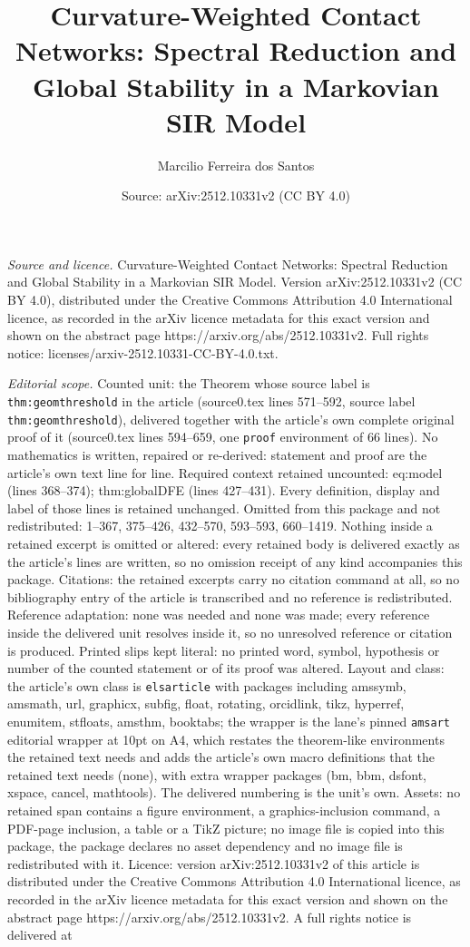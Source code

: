 \documentclass[10pt,a4paper]{amsart}
\title[Curvature-Weighted Contact Networks: Spectral Reduction and ]{Curvature-Weighted Contact Networks: Spectral Reduction and Global Stability in a Markovian SIR Model}
\author{Marcilio Ferreira dos Santos}
\date{Source: arXiv:2512.10331v2 (CC BY 4.0)}
\begin{document}
\maketitle

\noindent\emph{Source and licence.} Curvature-Weighted Contact Networks: Spectral Reduction and Global Stability in a Markovian SIR Model. Version arXiv:2512.10331v2 (CC BY 4.0), distributed under the Creative Commons Attribution 4.0 International licence, as recorded in the arXiv licence metadata for this exact version and shown on the abstract page https://arxiv.org/abs/2512.10331v2. Full rights notice: licenses/arxiv-2512.10331-CC-BY-4.0.txt.\par\smallskip

\noindent\textit{Editorial scope.} Counted unit: the Theorem whose source label is \texttt{thm:geomthreshold} in the article (source0.tex lines 571--592, source label \texttt{thm:geomthreshold}), delivered together with the article's own complete original proof of it (source0.tex lines 594--659, one \texttt{proof} environment of 66 lines). No mathematics is written, repaired or re-derived: statement and proof are the article's own text line for line. Required context retained uncounted: eq:model (lines 368--374); thm:globalDFE (lines 427--431). Every definition, display and label of those lines is retained unchanged. Omitted from this package and not redistributed: 1--367, 375--426, 432--570, 593--593, 660--1419. Nothing inside a retained excerpt is omitted or altered: every retained body is delivered exactly as the article's lines are written, so no omission receipt of any kind accompanies this package. Citations: the retained excerpts carry no citation command at all, so no bibliography entry of the article is transcribed and no reference is redistributed. Reference adaptation: none was needed and none was made; every reference inside the delivered unit resolves inside it, so no unresolved reference or citation is produced. Printed slips kept literal: no printed word, symbol, hypothesis or number of the counted statement or of its proof was altered. Layout and class: the article's own class is \texttt{elsarticle} with packages including amssymb, amsmath, url, graphicx, subfig, float, rotating, orcidlink, tikz, hyperref, enumitem, stfloats, amsthm, booktabs; the wrapper is the lane's pinned \texttt{amsart} editorial wrapper at 10pt on A4, which restates the theorem-like environments the retained text needs and adds the article's own macro definitions that the retained text needs (none), with extra wrapper packages (bm, bbm, dsfont, xspace, cancel, mathtools). The delivered numbering is the unit's own. Assets: no retained span contains a figure environment, a graphics-inclusion command, a PDF-page inclusion, a table or a TikZ picture; no image file is copied into this package, the package declares no asset dependency and no image file is redistributed with it. Licence: version arXiv:2512.10331v2 of this article is distributed under the Creative Commons Attribution 4.0 International licence, as recorded in the arXiv licence metadata for this exact version and shown on the abstract page https://arxiv.org/abs/2512.10331v2. A full rights notice is delivered at 
\end{document}
